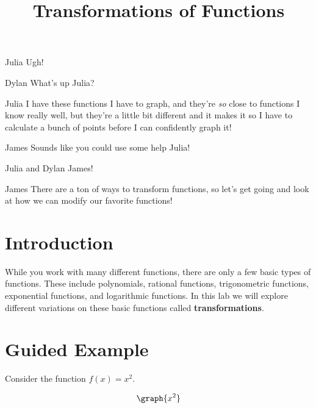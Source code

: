 \documentclass{ximera}
\title{Transformations of Functions}
\begin{document}
\maketitle
\begin{dialogue}
\item[Julia] Ugh!
\item[Dylan] What's up Julia?
\item[Julia] I have these functions I have to graph, and they're \textit{so} close to functions I know really well, but they're a little bit different and it makes it so I have to calculate a bunch of points before I can confidently graph it!
\item[James] Sounds like you could use some help Julia!
\item[Julia and Dylan] James!
\item[James] There are a ton of ways to transform functions, so let's get going and look at how we can modify our favorite functions!
\end{dialogue}
\section{Introduction}
While you work with many different functions, there are only a few basic types of functions. These include polynomials, rational functions, trigonometric functions, exponential functions, and logarithmic functions. In this lab we will explore different variations on these basic functions called \textbf{transformations}.
\section{Guided Example}
Consider the function $f(x)=x^2$.

\[
\graph{x^2}
\]
\end{document}
